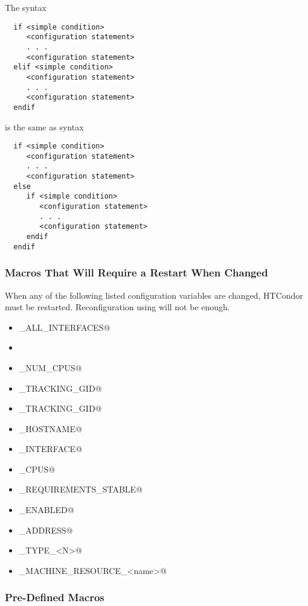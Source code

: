 The syntax
\begin{verbatim}
  if <simple condition>
     <configuration statement>
     . . .
     <configuration statement>
  elif <simple condition>
     <configuration statement>
     . . .
     <configuration statement>
  endif
\end{verbatim}
is the same as syntax
\begin{verbatim}
  if <simple condition>
     <configuration statement>
     . . .
     <configuration statement>
  else
     if <simple condition>
        <configuration statement>
        . . .
        <configuration statement>
     endif
  endif
\end{verbatim}

\subsubsection{\label{sec:Macros-Requiring-Restart}Macros That Will Require a Restart When Changed}
When any of the following listed configuration variables are changed,
HTCondor must be restarted.
Reconfiguration using  will not be enough.

\begin{itemize}
  \item \verb@BIND_ALL_INTERFACES@
  \item \verb@FetchWorkDelay@
  \item \verb@MAX_NUM_CPUS@
  \item \verb@MAX_TRACKING_GID@
  \item \verb@MIN_TRACKING_GID@
  \item \verb@NETWORK_HOSTNAME@
  \item \verb@NETWORK_INTERFACE@
  \item \verb@NUM_CPUS@
  \item \verb@PREEMPTION_REQUIREMENTS_STABLE@
  \item \verb@PRIVSEP_ENABLED@
  \item \verb@PROCD_ADDRESS@
  \item \verb@SLOT_TYPE_<N>@
  \item \verb@OFFLINE_MACHINE_RESOURCE_<name>@
\end{itemize}

\subsubsection{\label{sec:Pre-Defined-Macros}Pre-Defined Macros}

